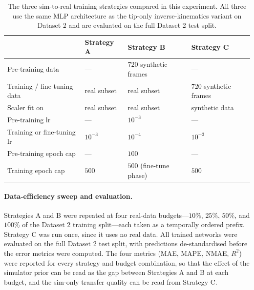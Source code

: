 \begin{table}[ht]
\centering
\caption[Sim-to-real training strategies.]{The three sim-to-real training strategies compared in this experiment. All three use the same MLP architecture as the tip-only inverse-kinematics variant on Dataset 2 and are evaluated on the full Dataset 2 test split.}
\label{tab:sim_strategies}
\begin{tabularx}{\linewidth}{@{}l X X X@{}}
\toprule
                             & Strategy A             & Strategy B                    & Strategy C                     \\
\midrule
Pre-training data            & ---                    & $720$ synthetic frames        & ---                            \\
Training / fine-tuning data  & real subset            & real subset                   & $720$ synthetic frames         \\
Scaler fit on                & real subset            & real subset                   & synthetic data                 \\
Pre-training $\mathrm{lr}$   & ---                    & $10^{-3}$                     & ---                            \\
Training or fine-tuning $\mathrm{lr}$ & $10^{-3}$     & $10^{-4}$                     & $10^{-3}$                      \\
Pre-training epoch cap       & ---                    & $100$                         & ---                            \\
Training epoch cap           & $500$                  & $500$ (fine-tune phase)       & $500$                          \\
\bottomrule
\end{tabularx}
\end{table}

\paragraph{Data-efficiency sweep and evaluation.}
Strategies A and B were repeated at four real-data budgets---$10\%$, $25\%$, $50\%$, and $100\%$ of the Dataset 2 training split---each taken as a temporally ordered prefix. Strategy C was run once, since it uses no real data. All trained networks were evaluated on the full Dataset 2 test split, with predictions de-standardised before the error metrics were computed. The four metrics (MAE, MAPE, NMAE, $R^{2}$) were reported for every strategy and budget combination, so that the effect of the simulator prior can be read as the gap between Strategies A and B at each budget, and the sim-only transfer quality can be read from Strategy C.

